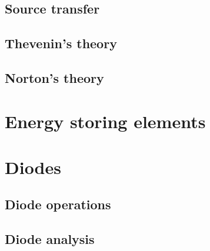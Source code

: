\documentclass[a4paper]{book}
\begin{document}
  \section{Source transfer}
  \section{Thevenin's theory}
  \section{Norton's theory}
\chapter{Energy storing elements}
\chapter{Diodes}
  \section{Diode operations}
  \section{Diode analysis}
\end{document}

